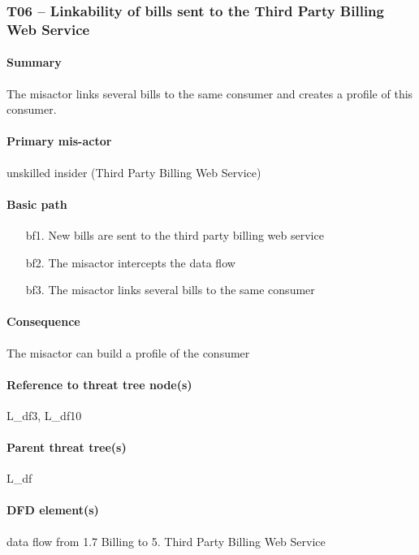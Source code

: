 \subsubsection{T06 -- Linkability of bills sent to the Third Party Billing Web
Service}

\paragraph{Summary} The misactor links several bills to the same consumer and
creates a profile of this consumer. 

\paragraph{Primary mis-actor} unskilled insider (Third Party Billing Web
Service)

\paragraph{Basic path}
\begin{enumerate}
	\item[bf1.] New bills are sent to the third party billing web service
	\item[bf2.] The misactor intercepts the data flow
	\item[bf3.] The misactor links several bills to the same consumer
\end{enumerate}

\paragraph{Consequence} The misactor can build a profile of the consumer

\paragraph{Reference to threat tree node(s)} L\_df3, L\_df10

\paragraph{Parent threat tree(s)} L\_df

\paragraph{DFD element(s)} data flow from 1.7 Billing to 5. Third Party Billing
Web Service

